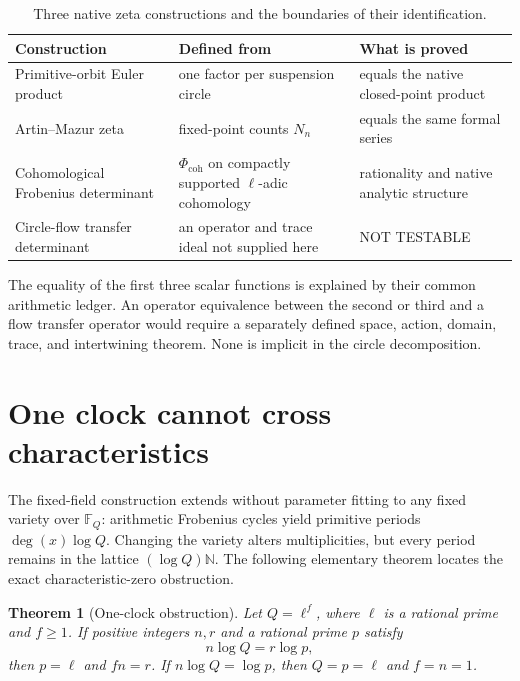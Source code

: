 \documentclass[11pt]{article}
\newtheorem{theorem}{Theorem}
\theoremstyle{definition}
\theoremstyle{remark}
\newcommand{\N}{\mathbb{N}}
\newcommand{\F}{\mathbb{F}}
\newcommand{\nottest}{\textsf{NOT TESTABLE}}
\begin{document}
\begin{table}[t]
\centering
\caption{Three native zeta constructions and the boundaries of their
identification.}
\label{tab:determinants}
\small
\begin{tabularx}{\textwidth}{@{}L{0.24\textwidth}Y L{0.25\textwidth}@{}}
\toprule
Construction & Defined from & What is proved\\
\midrule
Primitive-orbit Euler product & one factor per suspension circle & equals the native closed-point product\\
Artin--Mazur zeta & fixed-point counts \(N_n\) & equals the same formal series\\
Cohomological Frobenius determinant & \(\Phi_{\mathrm{coh}}\) on compactly supported \(\ell\)-adic cohomology & rationality and native analytic structure\\
Circle-flow transfer determinant & an operator and trace ideal not supplied here & \nottest\\
\bottomrule
\end{tabularx}
\end{table}

The equality of the first three scalar functions is explained by their common
arithmetic ledger.  An operator equivalence between the second or third and a
flow transfer operator would require a separately defined space, action,
domain, trace, and intertwining theorem.  None is implicit in the circle
decomposition.

\section{One clock cannot cross characteristics}
\label{sec:clock}

The fixed-field construction extends without parameter fitting to any fixed
variety over \(\F_Q\): arithmetic Frobenius cycles yield primitive periods
\(\deg(x)\log Q\).  Changing the variety alters multiplicities, but every
period remains in the lattice \((\log Q)\N\).  The following elementary
theorem locates the exact characteristic-zero obstruction.

\begin{theorem}[One-clock obstruction]
\label{thm:clock}
Let \(Q=\ell^f\), where \(\ell\) is a rational prime and \(f\geq1\).  If
positive integers \(n,r\) and a rational prime \(p\) satisfy
\begin{equation}
  n\log Q=r\log p,
  \label{eq:clock-equality}
\end{equation}
then \(p=\ell\) and \(fn=r\).  If
\(n\log Q=\log p\), then \(Q=p=\ell\) and \(f=n=1\).
\end{theorem}
\end{document}
